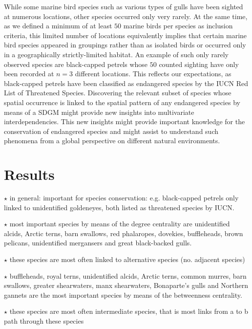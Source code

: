 \documentclass{statsoc}\usepackage[]{graphicx}\usepackage[]{color}
\begin{document}
While some marine bird species such as various types of gulls have been sighted at numerous locations, other species occurred only very rarely. At the same time, as we defined a minimum of at least $50$ marine birds per species as inclusion criteria, this limited number of locations equivalently implies that certain marine bird species appeared in groupings rather than as isolated birds or occurred only in a geographically strictly-limited habitat. An example of such only rarely observed species are black-capped petrels whose $50$ counted sighting have only been recorded at $n=3$ different locations. This reflects our expectations, as black-capped petrels have been classified as endangered species by the IUCN Red List of Threatened Species. Discovering the relevant subset of species whose spatial occurrence is linked to the spatial pattern of any endangered species  by means of a SDGM might provide new insights into multivariate interdependencies.  This new insights might provide important knowledge for the conservation of endangered species and might assist to understand such phenomena from a global perspective on different natural environments.    

\section{Results}

$\star$ in general: important for species conservation: e.g. black-capped petrels only linked to unidentified goldeneyes, both listed as threatened species by IUCN. 


$\star$ most important species by means of the degree centrality are unidentified alcids, Arctic terns, barn swallows, red phalaropes, dovekies, buffleheads, brown pelicans, unidentified mergansers and great black-backed gulls.


$\star$ these species are most often linked to alternative species (no. adjacent species)


$\star$ buffleheads, royal terns, unidentified alcids, Arctic terns, common murres, barn swallows, greater shearwaters, manx shearwaters, Bonaparte's gulls and Northern gannets are the most important species by means of the betweenness centrality.


$\star$ these species are most often intermediate species, that is most links from a to b path through these species



\end{document}
